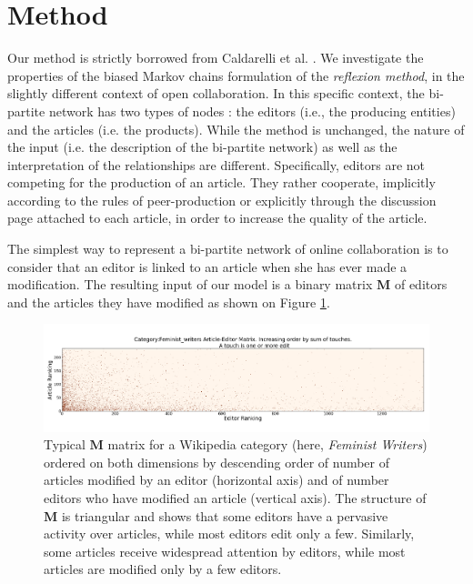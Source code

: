 \section{Method}
Our method is strictly borrowed from Caldarelli et al. \cite{caldarelli2012network}. We investigate the properties of the biased Markov chains formulation of the {\it reflexion method}, in the slightly different context of open collaboration. In this specific context, the bi-partite network has two types of nodes : the editors (i.e., the producing entities) and the articles (i.e. the products). While the method is unchanged, the nature of the input (i.e. the description of the bi-partite network) as well as the interpretation of the relationships are different. Specifically, editors are not competing for the production of an article. They rather cooperate, implicitly according to the rules of peer-production or explicitly through the discussion page attached to each article, in order to increase the quality of the article.

The simplest way to represent a bi-partite network of online collaboration is to consider that an editor is linked to an article when she has ever made a modification. The resulting input of our model is a binary matrix $\mathbf{M}$ of editors and the articles they have modified as shown on Figure \ref{fig:matrix}. 

\begin{figure}[!t]
\centering
\includegraphics[width=2.0\columnwidth]{Figures/Category_Feminist_writerstriangle_matrix_corrected.png}
\caption{Typical $\mathbf{M}$ matrix for a Wikipedia category (here, {\it Feminist Writers}) ordered on both dimensions by descending order of number of articles modified by an editor (horizontal axis) and of number editors who have modified an article (vertical axis). The structure of $\mathbf{M}$ is triangular and shows that some editors have a pervasive activity over articles, while most editors edit only a few. Similarly, some articles receive widespread attention by editors, while most articles are modified only by a few editors.}
\label{fig:matrix}
\end{figure}


